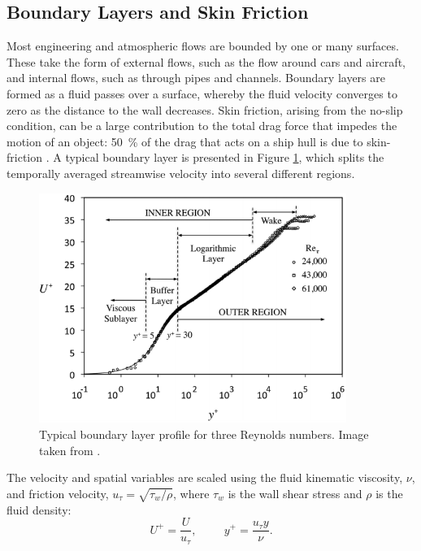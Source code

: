 \documentclass[12pt,oneside,a4paper]{article}
\begin{document}
\subsection{Boundary Layers and Skin Friction}
Most engineering and atmospheric flows are bounded by one or many surfaces. These take the form of external flows, such as the flow around cars and aircraft, and internal flows, such as through pipes and channels. Boundary layers are formed as a fluid passes over a surface, whereby the fluid velocity converges to zero as the distance to the wall decreases. Skin friction, arising from the no-slip condition, can be a large contribution to the total drag force that impedes the motion of an object: \SI{50}{\%} of the drag that acts on a ship hull is due to skin-friction \citep{perlin2016}. A typical boundary layer is presented in Figure \ref{figure:literatureReview:boundaryLayerRegions}, which splits the temporally averaged streamwise velocity into several different regions.
%
\begin{figure}[!b]
\centering
\includegraphics[width=10cm]{images/litReview/boundaryLayerRegions.png}
\caption{Typical boundary layer profile for three Reynolds numbers. Image taken from \cite{perlin2016}. }
\label{figure:literatureReview:boundaryLayerRegions}
\end{figure}
%
The velocity and spatial variables are scaled using the fluid kinematic viscosity, $\nu$, and friction velocity, $u_\tau = \sqrt{\tau_w / \rho}$, where $\tau_w$ is the wall shear stress and $\rho$ is the fluid density:
\begin{equation}
\label{equation:litReview:UplusYplus}
U^+ = \frac{U}{u_\tau}, \hspace{1cm} y^+ = \frac{u_\tau y }{\nu}.
\end{equation}
\end{document}
